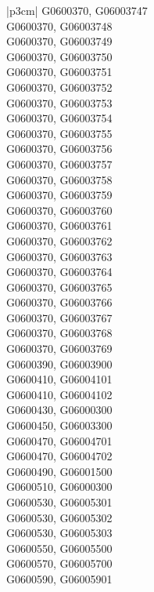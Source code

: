 \begin{customLongTable}{ |p{3cm}| }
G0600370, G06003747 \\ \hline
G0600370, G06003748 \\ \hline
G0600370, G06003749 \\ \hline
G0600370, G06003750 \\ \hline
G0600370, G06003751 \\ \hline
G0600370, G06003752 \\ \hline
G0600370, G06003753 \\ \hline
G0600370, G06003754 \\ \hline
G0600370, G06003755 \\ \hline
G0600370, G06003756 \\ \hline
G0600370, G06003757 \\ \hline
G0600370, G06003758 \\ \hline
G0600370, G06003759 \\ \hline
G0600370, G06003760 \\ \hline
G0600370, G06003761 \\ \hline
G0600370, G06003762 \\ \hline
G0600370, G06003763 \\ \hline
G0600370, G06003764 \\ \hline
G0600370, G06003765 \\ \hline
G0600370, G06003766 \\ \hline
G0600370, G06003767 \\ \hline
G0600370, G06003768 \\ \hline
G0600370, G06003769 \\ \hline
G0600390, G06003900 \\ \hline
G0600410, G06004101 \\ \hline
G0600410, G06004102 \\ \hline
G0600430, G06000300 \\ \hline
G0600450, G06003300 \\ \hline
G0600470, G06004701 \\ \hline
G0600470, G06004702 \\ \hline
G0600490, G06001500 \\ \hline
G0600510, G06000300 \\ \hline
G0600530, G06005301 \\ \hline
G0600530, G06005302 \\ \hline
G0600530, G06005303 \\ \hline
G0600550, G06005500 \\ \hline
G0600570, G06005700 \\ \hline
G0600590, G06005901 \\ \hline

\end{customLongTable}
